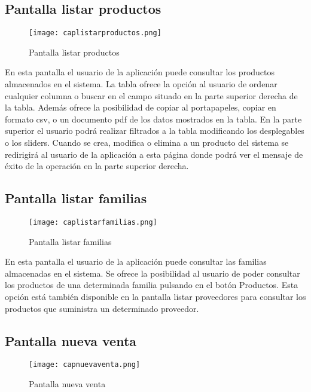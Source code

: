 \subsection {Pantalla listar productos}

\begin{figure}[!htb]
  \centering
    \texttt{[image: caplistarproductos.png]}
  \caption{Pantalla listar productos}
  \label{a}
\end{figure}

En esta pantalla el usuario de la aplicación puede consultar los productos almacenados en el sistema. La tabla ofrece la opción al usuario de ordenar cualquier columna o buscar en el campo situado en la parte superior derecha de la tabla. Además ofrece la posibilidad de copiar al portapapeles, copiar en formato csv, o un documento pdf de los datos mostrados en la tabla. En la parte superior el usuario podrá realizar filtrados a la tabla modificando los desplegables o los sliders. Cuando se crea, modifica o elimina a un producto del sistema se redirigirá al usuario de la aplicación a esta página donde podrá ver el mensaje de éxito de la operación en la parte superior derecha.

\newpage
\subsection {Pantalla listar familias}

\begin{figure}[!htb]
  \centering
    \texttt{[image: caplistarfamilias.png]}
  \caption{Pantalla listar familias}
  \label{a}
\end{figure}

En esta pantalla el usuario de la aplicación puede consultar las familias almacenadas en el sistema. Se ofrece la posibilidad al usuario de poder consultar los productos de una determinada familia pulsando en el botón Productos. Esta opción está también disponible en la pantalla listar proveedores para consultar los productos que suministra un determinado proveedor.

\newpage
\subsection {Pantalla nueva venta}

\begin{figure}[!htb]
  \centering
    \texttt{[image: capnuevaventa.png]}
  \caption{Pantalla nueva venta}
  \label{a}
\end{figure}

